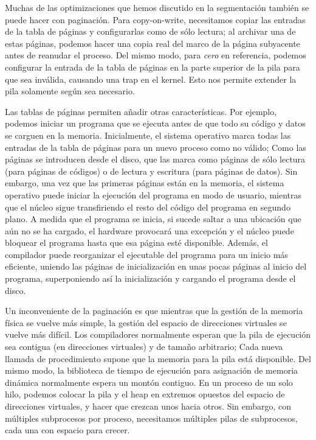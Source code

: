 \documentclass[10pt]{book}
\begin{document}
Muchas de las optimizaciones que hemos discutido en la segmentación también se puede hacer con paginación. Para copy-on-write, necesitamos copiar las entradas de la tabla de páginas y configurarlas como de sólo lectura; al archivar una de estas páginas, podemos hacer una copia real del marco de la página subyacente antes de reanudar el proceso. Del mismo modo, para \textit{cero} en referencia, podemos configurar la entrada de la tabla de páginas en la parte superior de la pila para que sea inválida, causando una trap en el kernel. Esto nos permite extender la pila solamente según sea necesario.

Las tablas de páginas permiten añadir otras características. Por ejemplo, podemos iniciar un programa que se ejecuta antes de que todo su código y datos se carguen en la memoria. Inicialmente, el sistema operativo marca todas las entradas de la tabla de páginas para un nuevo proceso como no válido; Como las páginas se introducen desde el disco, que las marca como páginas de sólo lectura (para páginas de códigos) o de lectura y escritura (para páginas de datos). Sin embargo, una vez que las primeras páginas están en la memoria, el sistema operativo puede iniciar la ejecución del programa en modo de usuario, mientras que el núcleo sigue transfiriendo el resto del código del programa en segundo plano. A medida que el programa se inicia, si sucede saltar a una ubicación que aún no se ha cargado, el hardware provocará una excepción y el núcleo puede bloquear el programa hasta que esa página esté disponible. Además, el compilador puede reorganizar el ejecutable del programa para un inicio más eficiente, uniendo las páginas de inicialización en unas pocas páginas al inicio del programa, superponiendo así la inicialización y cargando el programa desde el disco.

Un inconveniente de la paginación es que mientras que la gestión de la memoria física se vuelve más simple, la gestión del espacio de direcciones virtuales se vuelve más difícil. Los compiladores normalmente esperan que la pila de ejecución sea contigua (en direcciones virtuales) y de tamaño arbitrario; Cada nueva llamada de procedimiento supone que la memoria para la pila está disponible. Del mismo modo, la biblioteca de tiempo de ejecución para asignación de memoria dinámica normalmente espera un montón contiguo. En un proceso de un solo hilo, podemos colocar la pila y el heap en extremos opuestos del espacio de direcciones virtuales, y hacer que crezcan unos hacia otros. Sin embargo, con múltiples subprocesos por proceso, necesitamos múltiples pilas de subprocesos, cada una con espacio para crecer.
\end{document}
